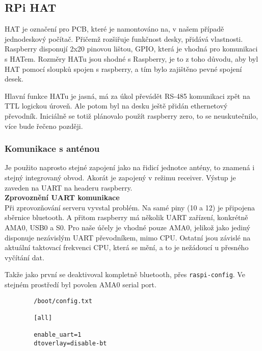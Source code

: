 \subsection{RPi HAT}
    HAT je označení pro PCB, které je namontováno na, v našem případě jednodeskový
    počítač. Přičemž rozšiřuje funkčnost desky, přidává vlastnosti. Raspberry disponují
    2x20 pinovou lištou, GPIO, která je vhodná pro komunikaci s HATem. Rozměry HATu jsou
    shodné s Raspberry, je to z toho důvodu, aby byl HAT pomocí sloupků spojen s
    raspberry, a tím bylo zajištěno pevné spojení desek.

    Hlavní funkce HATu je jasná, má za úkol převádět RS-485 komunikaci zpět na TTL
    logickou úroveň. Ale potom byl na desku ještě přidán ethernetový převodník. Iniciálně
    se totiž plánovalo použít raspberry zero, to se neuskutečnilo, více bude řečeno
    později.
\subsubsection{Komunikace s anténou}

    Je použito naprosto stejné zapojení jako na řidicí jednotce antény, to znamená i
    stejný integrovaný obvod. Akorát je zapojený v režimu receiver. Výstup je zaveden na
    UART na headeru raspberry.
\\

\textbf{Zprovoznění UART komunikace}
\\

    Při zprovozňování serveru vyvstal problém. Na samé piny (10 a 12) je připojena
    sběrnice bluetooth. A přitom raspberry má několik UART zařízení, konkrétně AMA0,
    USB0 a S0. Pro naše účely je vhodné pouze AMA0, jelikož jako jediný disponuje
    nezávislým UART převodníkem, mimo CPU. Ostatní jsou závislé na aktuální taktovací
    frekvenci CPU, která se mění, a to je nežádoucí u přesného vyčítání dat.

    Takže jako první se deaktivoval kompletně bluetooth, přes \verb|raspi-config|. Ve
    stejném prostředí byl povolen AMA0 serial port.

    \vspace{1em}

    \begin{lstlisting}
        /boot/config.txt

        [all]

        enable_uart=1
        dtoverlay=disable-bt
    \end{lstlisting}

